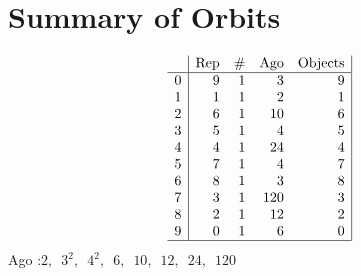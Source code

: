 

\section{Summary of Orbits}
$$
\begin{array}{r|*{4}{r}|}
 & \mbox{Rep} & \# & \mbox{Ago} & \mbox{Objects}\\
\hline
0 & 9 & 1 & 3 & 9\\
1 & 1 & 1 & 2 & 1\\
2 & 6 & 1 & 10 & 6\\
3 & 5 & 1 & 4 & 5\\
4 & 4 & 1 & 24 & 4\\
5 & 7 & 1 & 4 & 7\\
6 & 8 & 1 & 3 & 8\\
7 & 3 & 1 & 120 & 3\\
8 & 2 & 1 & 12 & 2\\
9 & 0 & 1 & 6 & 0\\
\hline
\end{array}
$$
Ago :$2,\,$ $3^2,\,$ $4^2,\,$ $6,\,$ $10,\,$ $12,\,$ $24,\,$ $120$ \\
